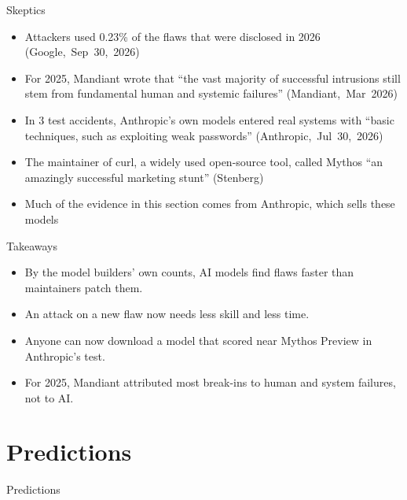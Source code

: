 \documentclass[11pt]{beamer}
\newcommand{\srccite}[1]{{\scriptsize\textcolor{citecol}{#1}}}
\newcommand{\vfy}{\unskip}
\newcommand{\vfy}{\unskip\nobreakspace{\scriptsize\textcolor{citecol}{[verify]}}}
\renewcommand{\srccite}[1]{{\scriptsize\textcolor{citecol}{\mbox{#1}}}}
\begin{document}
\begin{frame}{Skeptics}
\pause
\begin{itemize}\setlength\itemsep{8pt}
\item Attackers used 0.23\% of the flaws that were disclosed in 2026 \srccite{(Google, Sep 30, 2026)} \pause
\item For 2025, Mandiant wrote that ``the vast majority of successful intrusions still stem from fundamental human and systemic failures'' \srccite{(Mandiant, Mar 2026)} \pause
\item In 3 test accidents, Anthropic's own models entered real systems with ``basic techniques, such as exploiting weak passwords'' \srccite{(Anthropic, Jul 30, 2026)} \pause
\item The maintainer of curl, a widely used open-source tool, called Mythos ``an amazingly successful marketing stunt'' \srccite{(Stenberg)} \vfy \pause
\item Much of the evidence in this section comes from Anthropic, which sells these models
\end{itemize}
\end{frame}


\begin{frame}{Takeaways}
\vfill
\pause
\begin{itemize}\setlength\itemsep{12pt}
\item By the model builders' own counts, AI models find flaws faster than maintainers patch them. \pause
\item An attack on a new flaw now needs less skill and less time. \pause
\item Anyone can now download a model that scored near Mythos Preview in Anthropic's test. \pause
\item For 2025, Mandiant attributed most break-ins to human and system failures, not to AI.
\end{itemize}
\vfill
\end{frame}


\section{Predictions}

\begin{transition}{}{Predictions}
\end{transition}
\end{document}
